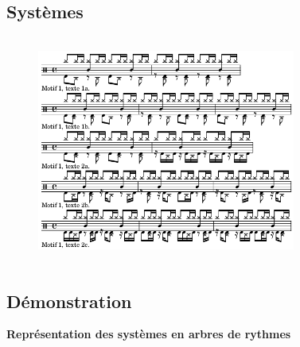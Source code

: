 \subsection*{Systèmes}
\begin{figure}[h]
	\includegraphics[height=75mm, width=85mm]{z_images/4_experimentations/2_experimentation_theorique/2_systeme_4-4_binaire.png}
\end{figure}
\subsection*{Démonstration}
\label{demo_sys}
\textbf{Représentation des systèmes en arbres de rythmes}

